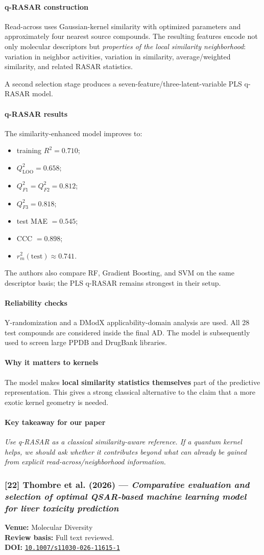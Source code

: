 \documentclass[11pt]{article}
\newcommand{\reviewfield}[2]{\paragraph{#1}#2}
\newcommand{\keytakeaway}[1]{\paragraph{Key takeaway for our paper}\emph{#1}}
\newcommand{\paperdoi}[1]{\href{https://doi.org/#1}{\texttt{#1}}}
\begin{document}
\reviewfield{q-RASAR construction}{
Read-across uses Gaussian-kernel similarity with optimized parameters and approximately four nearest source compounds. The resulting features encode not only molecular descriptors but \emph{properties of the local similarity neighborhood}: variation in neighbor activities, variation in similarity, average/weighted similarity, and related RASAR statistics.

A second selection stage produces a seven-feature/three-latent-variable PLS q-RASAR model.
}

\reviewfield{q-RASAR results}{
The similarity-enhanced model improves to:
\begin{itemize}
    \item training $R^2=0.710$;
    \item $Q^2_{\mathrm{LOO}}=0.658$;
    \item $Q^2_{F1}=Q^2_{F2}=0.812$;
    \item $Q^2_{F3}=0.818$;
    \item test MAE $=0.545$;
    \item CCC $=0.898$;
    \item $r_m^2(\mathrm{test})\approx0.741$.
\end{itemize}
The authors also compare RF, Gradient Boosting, and SVM on the same descriptor basis; the PLS q-RASAR remains strongest in their setup.
}

\reviewfield{Reliability checks}{
Y-randomization and a DModX applicability-domain analysis are used. All 28 test compounds are considered inside the final AD. The model is subsequently used to screen large PPDB and DrugBank libraries.
}

\reviewfield{Why it matters to kernels}{
The model makes \textbf{local similarity statistics themselves} part of the predictive representation. This gives a strong classical alternative to the claim that a more exotic kernel geometry is needed.
}

\keytakeaway{Use q-RASAR as a classical similarity-aware reference. If a quantum kernel helps, we should ask whether it contributes beyond what can already be gained from explicit read-across/neighborhood information.}

\subsubsection{[22] Thombre et al. (2026) --- \textit{Comparative evaluation and selection of optimal QSAR-based machine learning model for liver toxicity prediction}}
\textbf{Venue:} Molecular Diversity\\
\textbf{Review basis:} Full text reviewed.\\
\textbf{DOI:} \paperdoi{10.1007/s11030-026-11615-1}
\end{document}
